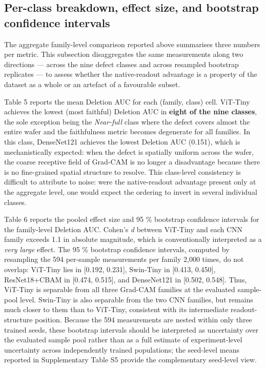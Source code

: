 \documentclass[11pt,a4paper]{article}
\begin{document}
\subsection{Per-class breakdown, effect size, and bootstrap confidence intervals}

The aggregate family-level comparison reported above summarises three numbers per metric. This subsection disaggregates the same measurements along two directions --- across the nine defect classes and across resampled bootstrap replicates --- to assess whether the native-readout advantage is a property of the dataset as a whole or an artefact of a favourable subset.

Table 5 reports the mean Deletion AUC for each (family, class) cell. ViT-Tiny achieves the lowest (most faithful) Deletion AUC in \textbf{eight of the nine classes}, the sole exception being the \emph{Near-full} class where the defect covers almost the entire wafer and the faithfulness metric becomes degenerate for all families. In this class, DenseNet121 achieves the lowest Deletion AUC (0.151), which is mechanistically expected: when the defect is spatially uniform across the wafer, the coarse receptive field of Grad-CAM is no longer a disadvantage because there is no fine-grained spatial structure to resolve. This class-level consistency is difficult to attribute to noise: were the native-readout advantage present only at the aggregate level, one would expect the ordering to invert in several individual classes.

Table 6 reports the pooled effect size and 95 \% bootstrap confidence intervals for the family-level Deletion AUC. Cohen's \emph{d} between ViT-Tiny and each CNN family exceeds 1.1 in absolute magnitude, which is conventionally interpreted as a \emph{very large} effect. The 95 \% bootstrap confidence intervals, computed by resampling the 594 per-sample measurements per family 2,000 times, do not overlap: ViT-Tiny lies in [0.192, 0.231], Swin-Tiny in [0.413, 0.450], ResNet18+CBAM in [0.474, 0.515], and DenseNet121 in [0.502, 0.548]. Thus, ViT-Tiny is separable from all three Grad-CAM families at the evaluated sample-pool level. Swin-Tiny is also separable from the two CNN families, but remains much closer to them than to ViT-Tiny, consistent with its intermediate readout-structure position. Because the 594 measurements are nested within only three trained seeds, these bootstrap intervals should be interpreted as uncertainty over the evaluated sample pool rather than as a full estimate of experiment-level uncertainty across independently trained populations; the seed-level means reported in Supplementary Table S5 provide the complementary seed-level view.
\end{document}
